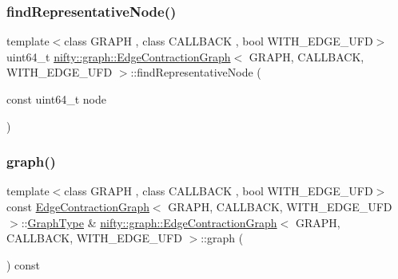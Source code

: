 \mbox{\label{classnifty_1_1graph_1_1EdgeContractionGraph_a96db6fdacf91e9f67d505f1bfc33ef76}} 
\subsubsection{\texorpdfstring{find\+Representative\+Node()}{findRepresentativeNode()}\hspace{0.1cm}{\footnotesize\ttfamily [2/2]}}
{\footnotesize\ttfamily template$<$class G\+R\+A\+PH , class C\+A\+L\+L\+B\+A\+CK , bool W\+I\+T\+H\+\_\+\+E\+D\+G\+E\+\_\+\+U\+FD$>$ \\
uint64\+\_\+t \hyperlink{classnifty_1_1graph_1_1EdgeContractionGraph}{nifty\+::graph\+::\+Edge\+Contraction\+Graph}$<$ G\+R\+A\+PH, C\+A\+L\+L\+B\+A\+CK, W\+I\+T\+H\+\_\+\+E\+D\+G\+E\+\_\+\+U\+FD $>$\+::find\+Representative\+Node (\begin{DoxyParamCaption}\item[{const uint64\+\_\+t}]{node }\end{DoxyParamCaption})\hspace{0.3cm}{\ttfamily [inline]}}

\mbox{\label{classnifty_1_1graph_1_1EdgeContractionGraph_a422ab3344774fa68583658effa1fca95}} 
\subsubsection{\texorpdfstring{graph()}{graph()}}
{\footnotesize\ttfamily template$<$class G\+R\+A\+PH , class C\+A\+L\+L\+B\+A\+CK , bool W\+I\+T\+H\+\_\+\+E\+D\+G\+E\+\_\+\+U\+FD$>$ \\
const \hyperlink{classnifty_1_1graph_1_1EdgeContractionGraph}{Edge\+Contraction\+Graph}$<$ G\+R\+A\+PH, C\+A\+L\+L\+B\+A\+CK, W\+I\+T\+H\+\_\+\+E\+D\+G\+E\+\_\+\+U\+FD $>$\+::\hyperlink{classnifty_1_1graph_1_1EdgeContractionGraph_a67f653761dbc2c203891b041aacc3f04}{Graph\+Type} \& \hyperlink{classnifty_1_1graph_1_1EdgeContractionGraph}{nifty\+::graph\+::\+Edge\+Contraction\+Graph}$<$ G\+R\+A\+PH, C\+A\+L\+L\+B\+A\+CK, W\+I\+T\+H\+\_\+\+E\+D\+G\+E\+\_\+\+U\+FD $>$\+::graph (\begin{DoxyParamCaption}{ }\end{DoxyParamCaption}) const\hspace{0.3cm}{\ttfamily [inline]}}

